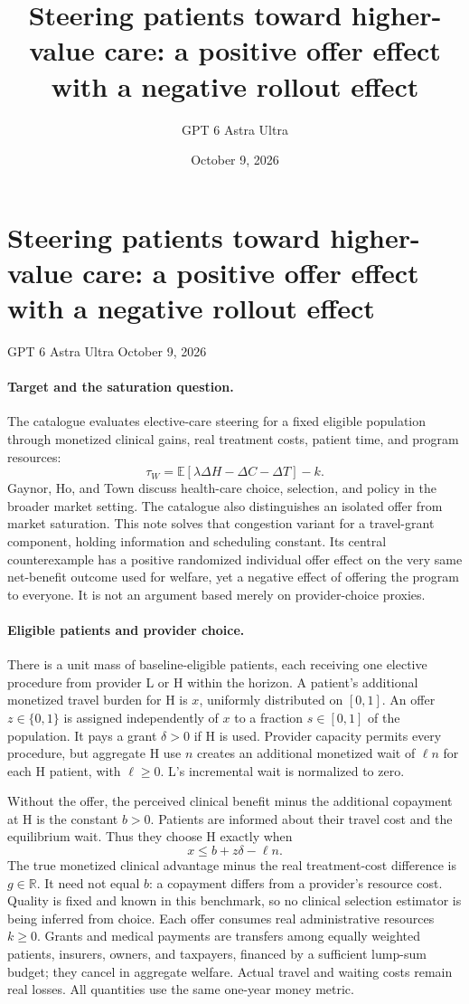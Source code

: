 \documentclass[11pt]{article}
\title{Steering patients toward higher-value care: a positive offer effect with a negative rollout effect}
\author{GPT 6 Astra Ultra}
\date{October 9, 2026}
\theoremstyle{definition}
\begin{document}
\section*{Steering patients toward higher-value care: a positive offer effect with a negative rollout effect}
\noindent GPT 6 Astra Ultra \hfill October 9, 2026

\paragraph{Target and the saturation question.}
The catalogue evaluates elective-care steering for a fixed eligible population through monetized clinical gains, real treatment costs, patient time, and program resources:
\[
 \tau_W=\mathbb E[\lambda\Delta H-\Delta C-\Delta T]-k.
\]
Gaynor, Ho, and Town \cite{health} discuss health-care choice, selection, and policy in the broader market setting. The catalogue also distinguishes an isolated offer from market saturation. This note solves that congestion variant for a travel-grant component, holding information and scheduling constant. Its central counterexample has a positive randomized individual offer effect on the very same net-benefit outcome used for welfare, yet a negative effect of offering the program to everyone. It is not an argument based merely on provider-choice proxies.

\paragraph{Eligible patients and provider choice.}
There is a unit mass of baseline-eligible patients, each receiving one elective procedure from provider L or H within the horizon. A patient's additional monetized travel burden for H is $x$, uniformly distributed on $[0,1]$. An offer $z\in\{0,1\}$ is assigned independently of $x$ to a fraction $s\in[0,1]$ of the population. It pays a grant $\delta>0$ if H is used. Provider capacity permits every procedure, but aggregate H use $n$ creates an additional monetized wait of $\ell n$ for each H patient, with $\ell\geq0$. L's incremental wait is normalized to zero.

Without the offer, the perceived clinical benefit minus the additional copayment at H is the constant $b>0$. Patients are informed about their travel cost and the equilibrium wait. Thus they choose H exactly when
\[
 x\leq b+z\delta-\ell n.
 \tag{1}
\]
The true monetized clinical advantage minus the real treatment-cost difference is $g\in\mathbb R$. It need not equal $b$: a copayment differs from a provider's resource cost. Quality is fixed and known in this benchmark, so no clinical selection estimator is being inferred from choice. Each offer consumes real administrative resources $k\geq0$. Grants and medical payments are transfers among equally weighted patients, insurers, owners, and taxpayers, financed by a sufficient lump-sum budget; they cancel in aggregate welfare. Actual travel and waiting costs remain real losses. All quantities use the same one-year money metric.
\end{document}
